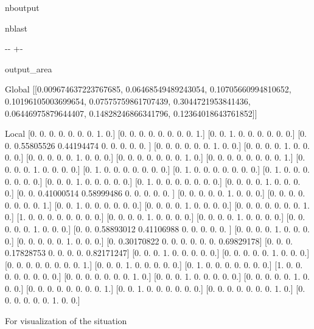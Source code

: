 \documentclass[letterpaper,10pt,english]{sphinxmanual}
\begin{document}
\begin{sphinxuseclass}{nboutput}
\begin{sphinxuseclass}{nblast}
{

\kern-\sphinxverbatimsmallskipamount\kern-\baselineskip
\kern+\FrameHeightAdjust\kern-\fboxrule
\vspace{\nbsphinxcodecellspacing}

\begin{sphinxuseclass}{output_area}
\begin{sphinxuseclass}{}


\begin{sphinxVerbatim}[commandchars=\\\{\}]
Global
[[0.009674637223767685, 0.06468549489243054, 0.10705660994810652, 0.10196105003699654, 0.07575759861707439, 0.3044721953841436, 0.06446975879644407, 0.14828246866341796, 0.12364018643761852]]


 Local
[0. 0. 0. 0. 0. 0. 0. 1. 0.]
[0. 0. 0. 0. 0. 0. 0. 0. 1.]
[0. 0. 1. 0. 0. 0. 0. 0. 0.]
[0.         0.         0.55805526 0.44194474 0.         0.
 0.         0.         0.        ]
[0. 0. 0. 0. 0. 0. 1. 0. 0.]
[0. 0. 0. 0. 1. 0. 0. 0. 0.]
[0. 0. 0. 0. 0. 1. 0. 0. 0.]
[0. 0. 0. 0. 0. 0. 0. 1. 0.]
[0. 0. 0. 0. 0. 0. 0. 0. 1.]
[0. 0. 0. 0. 1. 0. 0. 0. 0.]
[0. 1. 0. 0. 0. 0. 0. 0. 0.]
[0. 1. 0. 0. 0. 0. 0. 0. 0.]
[0. 1. 0. 0. 0. 0. 0. 0. 0.]
[0. 0. 0. 1. 0. 0. 0. 0. 0.]
[0. 1. 0. 0. 0. 0. 0. 0. 0.]
[0. 0. 0. 0. 1. 0. 0. 0. 0.]
[0.         0.         0.41000514 0.58999486 0.         0.
 0.         0.         0.        ]
[0. 0. 0. 0. 0. 1. 0. 0. 0.]
[0. 0. 0. 0. 0. 0. 0. 0. 1.]
[0. 0. 1. 0. 0. 0. 0. 0. 0.]
[0. 0. 0. 0. 1. 0. 0. 0. 0.]
[0. 0. 0. 0. 0. 0. 0. 1. 0.]
[1. 0. 0. 0. 0. 0. 0. 0. 0.]
[0. 0. 0. 0. 1. 0. 0. 0. 0.]
[0. 0. 0. 0. 1. 0. 0. 0. 0.]
[0. 0. 0. 0. 0. 1. 0. 0. 0.]
[0.         0.         0.58893012 0.41106988 0.         0.
 0.         0.         0.        ]
[0. 0. 0. 0. 1. 0. 0. 0. 0.]
[0. 0. 0. 0. 0. 1. 0. 0. 0.]
[0.         0.30170822 0.         0.         0.         0.
 0.         0.         0.69829178]
[0.         0.         0.         0.17828753 0.         0.
 0.         0.         0.82171247]
[0. 0. 0. 1. 0. 0. 0. 0. 0.]
[0. 0. 0. 0. 0. 1. 0. 0. 0.]
[0. 0. 0. 0. 0. 0. 0. 0. 1.]
[0. 0. 0. 1. 0. 0. 0. 0. 0.]
[0. 1. 0. 0. 0. 0. 0. 0. 0.]
[1. 0. 0. 0. 0. 0. 0. 0. 0.]
[0. 0. 0. 0. 0. 0. 0. 1. 0.]
[0. 0. 0. 1. 0. 0. 0. 0. 0.]
[0. 0. 0. 0. 0. 1. 0. 0. 0.]
[0. 0. 0. 0. 0. 0. 0. 0. 1.]
[0. 0. 1. 0. 0. 0. 0. 0. 0.]
[0. 0. 0. 0. 0. 0. 0. 1. 0.]
[0. 0. 0. 0. 0. 0. 1. 0. 0.]
\end{sphinxVerbatim}



\end{sphinxuseclass}
\end{sphinxuseclass}
}

\end{sphinxuseclass}
\end{sphinxuseclass}
\sphinxAtStartPar
For visualization of the situation
\end{document}
